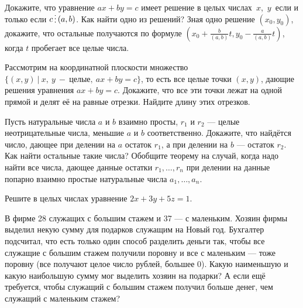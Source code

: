 \documentclass[a4paper,12pt]{article}
\newcommand{\0}[1]{\overline{#1}}
\begin{document}

 Докажите, что уравнение
$ax+by=c$ имеет решение в целых числах~$x$,~$y$~если
и только если %
$c\del(a,b)$.
 Как найти одно из решений? %
 Зная одно решение $(x_0,y_0)$, докажите, что остальные получаются по формуле $\left(x_0+\frac{b}{(a,b)}t,y_0-\frac{a}{(a,b)}t\right)$, когда $t$ пробегает все целые числа.

Рассмотрим на координатной плоскости множество $\{(x,y)\ | \ x,\ y\ -\ \text{целые},\ ax+by=c\}$,
то есть все целые точки $(x,y)$, дающие решения уравнения $ax+by=c$.
 Докажите, что все эти точки лежат на одной прямой и делят её на равные отрезки.
 Найдите длину этих отрезков.

  Пусть натуральные числа $a$ и $b$ взаимно просты, $r_1$ и $r_2$ --- целые неотрицательные числа, меньшие $a$ и $b$ соответственно. Докажите, что найдётся число, дающее при делении на $a$ остаток $r_1$, а при делении на $b$ --- остаток $r_2$.
 Как найти остальные такие числа?
 Обобщите теорему на случай, когда надо найти все числа, дающее данные остатки $r_1,\ldots,r_n$ при делении на данные попарно взаимно простые натуральные числа $a_1,\dots,a_n$.

Решите в целых числах уравнение $2x+3y+5z=1$.

 В фирме 28 служащих с большим стажем и 37 --- с маленьким. Хозяин фирмы выделил некую сумму для подарков служащим на Новый год. Бухгалтер подсчитал, что есть только один способ разделить деньги так, чтобы все служащие с большим стажем получили поровну и все с маленьким --- тоже поровну (все получают целое число рублей, большее 0). Какую наименьшую и какую наибольшую сумму мог выделить хозяин на подарки?
 А если ещё требуется, чтобы служащий с большим стажем получил больше денег, чем служащий с маленьким стажем?

\end{document}
